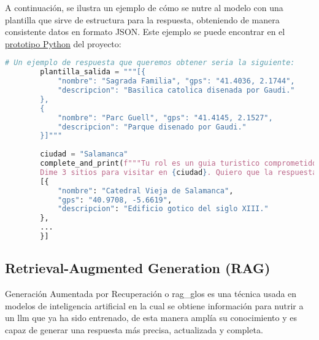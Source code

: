 	A continuación, se ilustra un ejemplo de cómo se nutre al modelo con una plantilla que sirve de estructura para la respuesta, obteniendo de manera consistente datos en formato JSON. Este ejemplo se puede encontrar en el \href{https://github.com/fps1001/TFGII_FPisot/tree/main/project-prototypes/prompting.ipynb}{prototipo Python} del proyecto: 
	
	\begin{lstlisting}[language=Python, caption={Ejemplo de uso de \textit{few-shot} y \textit{tool-calling} para obtener puntos de interés turísticos}]
		# Un ejemplo de respuesta que queremos obtener seria la siguiente:
		plantilla_salida = """[{
			"nombre": "Sagrada Familia", "gps": "41.4036, 2.1744", 
			"descripcion": "Basilica catolica disenada por Gaudi." 
		},
		{
			"nombre": "Parc Guell", "gps": "41.4145, 2.1527", 
			"descripcion": "Parque disenado por Gaudi."
		}]"""
		
		ciudad = "Salamanca"
		complete_and_print(f"""Tu rol es un guia turistico comprometido con el medio ambiente preocupado por la gentrificacion de las ciudades y el turismo masivo. 
		Dime 3 sitios para visitar en {ciudad}. Quiero que la respuesta consista SOLO en los lugares de interes de este lugar, siguiendo el ejemplo de la {plantilla_salida}. Insisto en que no quiero que me des informacion adicional.""") # Resultado esperado:
		[{
			"nombre": "Catedral Vieja de Salamanca", 
			"gps": "40.9708, -5.6619", 
			"descripcion": "Edificio gotico del siglo XIII."
		},
		...
		}]
	\end{lstlisting}
	
	\subsection{Retrieval-Augmented Generation (RAG)}
	Generación Aumentada por Recuperación o \gls{rag_glos} es una técnica usada en modelos de inteligencia artificial en la cual se obtiene información para nutrir a un \acrlong{llm} que ya ha sido entrenado, de esta manera amplía su conocimiento y es capaz de generar una respuesta más precisa, actualizada y completa.
	
